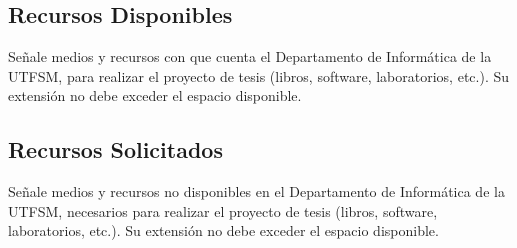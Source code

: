 \documentclass[12pt,spanish]{article}
\begin{document}
\subsection{Recursos Disponibles}
Señale medios y recursos con que cuenta el Departamento de Informática
de la UTFSM, para realizar el proyecto de tesis (libros, software,
laboratorios, etc.). Su extensión no debe exceder el espacio
disponible.


\subsection{Recursos Solicitados}
Señale medios y recursos no disponibles en el Departamento de
Informática de la UTFSM, necesarios para realizar el proyecto de tesis
(libros, software, laboratorios, etc.). Su extensión no debe exceder
el espacio disponible.

\end{document}

